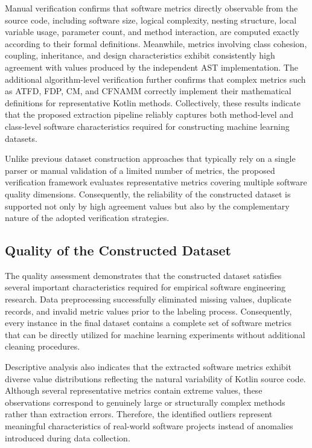 \documentclass[]{einformatica}
\begin{document}
Manual verification confirms that software metrics directly observable from the source code, including software size, logical complexity, nesting structure, local variable usage, parameter count, and method interaction, are computed exactly according to their formal definitions. Meanwhile, metrics involving class cohesion, coupling, inheritance, and design characteristics exhibit consistently high agreement with values produced by the independent AST implementation. The additional algorithm-level verification further confirms that complex metrics such as ATFD, FDP, CM, and CFNAMM correctly implement their mathematical definitions for representative Kotlin methods. Collectively, these results indicate that the proposed extraction pipeline reliably captures both method-level and class-level software characteristics required for constructing machine learning datasets.

Unlike previous dataset construction approaches that typically rely on a single parser or manual validation of a limited number of metrics, the proposed verification framework evaluates representative metrics covering multiple software quality dimensions. Consequently, the reliability of the constructed dataset is supported not only by high agreement values but also by the complementary nature of the adopted verification strategies.

\subsection{Quality of the Constructed Dataset}

The quality assessment demonstrates that the constructed dataset satisfies several important characteristics required for empirical software engineering research. Data preprocessing successfully eliminated missing values, duplicate records, and invalid metric values prior to the labeling process. Consequently, every instance in the final dataset contains a complete set of software metrics that can be directly utilized for machine learning experiments without additional cleaning procedures.

Descriptive analysis also indicates that the extracted software metrics exhibit diverse value distributions reflecting the natural variability of Kotlin source code. Although several representative metrics contain extreme values, these observations correspond to genuinely large or structurally complex methods rather than extraction errors. Therefore, the identified outliers represent meaningful characteristics of real-world software projects instead of anomalies introduced during data collection.
\end{document}

